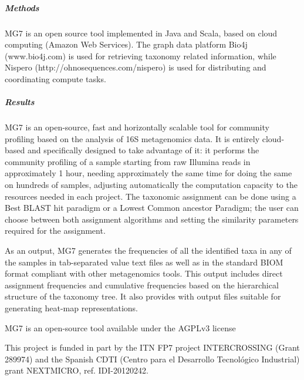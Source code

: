 \subparagraph{Methods}\label{methods}

MG7 is an open source tool implemented in Java and Scala, based on cloud
computing (Amazon Web Services). The graph data platform Bio4j
(www.bio4j.com) is used for retrieving taxonomy related information,
while Nispero (http://ohnosequences.com/nispero) is used for
distributing and coordinating compute tasks.

\subparagraph{Results}\label{results}

MG7 is an open-source, fast and horizontally scalable tool for community
profiling based on the analysis of 16S metagenomics data. It is entirely
cloud-based and specifically designed to take advantage of it: it
performs the community profiling of a sample starting from raw Illumina
reads in approximately 1 hour, needing approximately the same time for
doing the same on hundreds of samples, adjusting automatically the
computation capacity to the resources needed in each project. The
taxonomic assignment can be done using a Best BLAST hit paradigm or a
Lowest Common ancestor Paradigm; the user can choose between both
assignment algorithms and setting the similarity parameters required for
the assignment.

As an output, MG7 generates the frequencies of all the identified taxa
in any of the samples in tab-separated value text files as well as in
the standard BIOM format compliant with other metagenomics tools. This
output includes direct assignment frequencies and cumulative frequencies
based on the hierarchical structure of the taxonomy tree. It also
provides with output files suitable for generating heat-map
representations.

MG7 is an open-source tool available under the AGPLv3 license

This project is funded in part by the ITN FP7 project INTERCROSSING
(Grant 289974) and the Spanish CDTI (Centro para el Desarrollo
Tecnológico Industrial) grant NEXTMICRO, ref. IDI-20120242.
